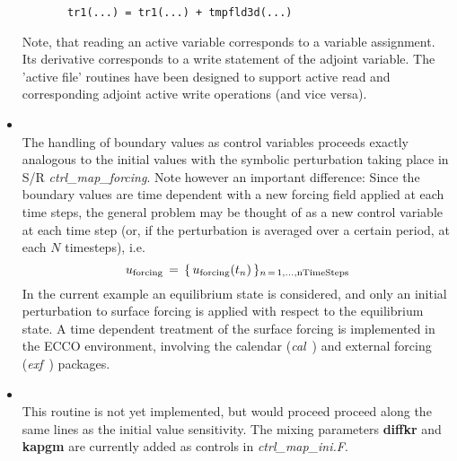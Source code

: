 \begin{itemize}
\begin{verbatim}
       tr1(...) = tr1(...) + tmpfld3d(...)
\end{verbatim}
%
Note, that reading an active variable corresponds
to a variable assignment. Its derivative corresponds
to a write statement of the adjoint variable.
The 'active file' routines have been designed
to support active read and corresponding adjoint active write
operations (and vice versa).
%
\item 
{}
\\
%
The handling of boundary values as control variables
proceeds exactly analogous to the initial values
with the symbolic perturbation taking place in S/R
{\it ctrl\_map\_forcing}.
Note however an important difference:
Since the boundary values are time dependent with a new
forcing field applied at each time steps,
the general problem may be thought of as
a new control variable at each time step
(or, if the perturbation is averaged over a certain period,
at each $ N $ timesteps), i.e.
\[
u_{\rm forcing} \, = \,
\{ \, u_{\rm forcing} ( t_n ) \, \}_{
n \, = \, 1, \ldots , {\rm nTimeSteps} }
\]
%
In the current example an equilibrium state is considered,
and only an initial perturbation to
surface forcing is applied with respect to the
equilibrium state.
A time dependent treatment of the surface forcing is 
implemented in the ECCO environment, involving the
calendar ({\it cal}~) and external forcing ({\it exf}~) packages.
%
\item 
{}
\\
%
This routine is not yet implemented, but would proceed
proceed along the same lines as the initial value sensitivity.
The mixing parameters {\bf diffkr} and {\bf kapgm}
are currently added as controls in {\it ctrl\_map\_ini.F}.
%
\end{itemize}
%

